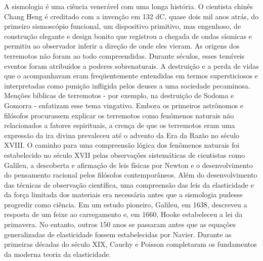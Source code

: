 \documentclass[]{book}
\theoremstyle{definition}
\theoremstyle{definition}
\theoremstyle{definition}
\theoremstyle{remark}
\begin{document}
A sismologia é uma ciência venerável com uma longa história. O cientista chinês Chang Heng é creditado com a invenção em 132 dC, quase dois mil anos atrás, do primeiro sismoscópio funcional, um dispositivo primitivo, mas engenhoso, de construção elegante e design bonito que registrou a chegada de ondas sísmicas e permitiu ao observador inferir a direção de onde eles vieram. As origens dos terremotos não foram ao todo compreendidas. Durante séculos, esses temíveis eventos foram atribuídos a poderes sobrenaturais. A destruição e a perda de vidas que o acompanhavam eram freqüentemente entendidas em termos supersticiosos e interpretadas como punição infligida pelos deuses a uma sociedade pecaminosa. Menções bíblicas de terremotos - por exemplo, na destruição de Sodoma e Gomorra - enfatizam esse tema vingativo.
Embora os primeiros astrônomos e filósofos procurassem explicar os terremotos como fenômenos naturais não relacionados a fatores espirituais, a crença de que os terremotos eram uma expressão da ira divina prevaleceu até o advento da Era da Razão no século XVIII. O caminho para uma compreensão lógica dos fenômenos naturais foi estabelecido no século XVII pelas observações sistemáticas de cientistas como Galileu, a descoberta e afirmação de leis físicas por Newton e o desenvolvimento do pensamento racional pelos filósofos contemporâneos.
Além do desenvolvimento das técnicas de observação científica, uma compreensão das leis da elasticidade e da força limitada dos materiais era necessária antes que a sismologia pudesse progredir como ciência. Em um estudo pioneiro, Galileu, em 1638, descreveu a resposta de um feixe ao carregamento e, em 1660, Hooke estabeleceu a lei da primavera. No entanto, outros 150 anos se passaram antes que as equações generalizadas de elasticidade fossem estabelecidas por Navier. Durante as primeiras décadas do século XIX, Cauchy e Poisson completaram os fundamentos da moderna teoria da elasticidade.
\end{document}
